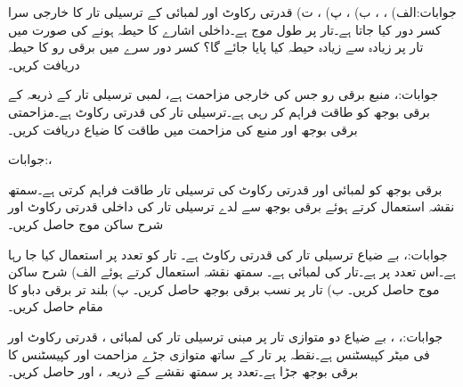جوابات:الف) ، ،  ب) ،  پ) ،  ت) 
قدرتی رکاوٹ  اور لمبائی  کے ترسیلی تار کا خارجی سرا کسر دور کیا جاتا ہے۔تار پر طول موج  ہے۔داخلی اشارے کا حیطہ  ہونے کی صورت میں تار پر زیادہ سے زیادہ حیطہ کیا پایا جائے گا؟ کسر دور سرے میں برقی رو کا حیطہ دریافت کریں۔

جوابات:، 
منبع برقی رو  جس کی خارجی مزاحمت  ہے،  لمبی ترسیلی تار کے ذریعہ  کے برقی بوجھ کو طاقت فراہم کر رہی ہے۔ترسیلی تار کی قدرتی رکاوٹ  ہے۔مزاحمتی برقی بوجھ اور منبع کی مزاحمت میں طاقت کا ضیاع دریافت کریں۔

جوابات:، 

برقی بوجھ  کو  لمبائی اور  قدرتی رکاوٹ کی ترسیلی تار طاقت فراہم کرتی ہے۔سمتھ نقشہ استعمال کرتے ہوئے برقی بوجھ سے لدے  ترسیلی تار کی داخلی قدرتی رکاوٹ  اور شرح ساکن موج  حاصل کریں۔

جوابات:، 
بے ضیاع ترسیلی تار کی قدرتی رکاوٹ   ہے۔ تار کو  تعدد پر استعمال کیا جا رہا ہے۔اس
 تعدد پر  ہے۔تار کی لمبائی  ہے۔ سمتھ نقشہ استعمال کرتے ہوئے  الف) شرح ساکن موج حاصل کریں۔ ب) تار پر نسب برقی بوجھ  حاصل کریں۔ پ) بلند تر برقی دباو کا مقام حاصل کریں۔

جوابات:، ، 
بے ضیاع دو متوازی تار پر مبنی ترسیلی تار کی لمبائی ، قدرتی رکاوٹ  اور فی میٹر کپیسٹنس  ہے۔نقطہ  پر تار کے ساتھ متوازی جڑے مزاحمت  اور کپیسٹنس  کا برقی بوجھ جڑا ہے۔تعدد  پر سمتھ نقشے کے ذریعہ ،  اور  حاصل کریں۔

